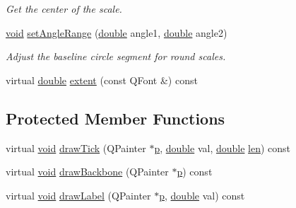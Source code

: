 \begin{DoxyCompactItemize}
\begin{DoxyCompactList}\small\item\em Get the center of the scale. \end{DoxyCompactList}\item 
\hyperlink{group___u_a_v_objects_plugin_ga444cf2ff3f0ecbe028adce838d373f5c}{void} \hyperlink{class_qwt_round_scale_draw_a5d85678fdb9fbb4d622425aab9ecc681}{set\-Angle\-Range} (\hyperlink{_super_l_u_support_8h_a8956b2b9f49bf918deed98379d159ca7}{double} angle1, \hyperlink{_super_l_u_support_8h_a8956b2b9f49bf918deed98379d159ca7}{double} angle2)
\begin{DoxyCompactList}\small\item\em Adjust the baseline circle segment for round scales. \end{DoxyCompactList}\item 
virtual \hyperlink{_super_l_u_support_8h_a8956b2b9f49bf918deed98379d159ca7}{double} \hyperlink{class_qwt_round_scale_draw_a786fd49ec94ab51bb75d7a2f495b2727}{extent} (const Q\-Font \&) const 
\end{DoxyCompactItemize}
\subsection*{Protected Member Functions}
\begin{DoxyCompactItemize}
\item 
virtual \hyperlink{group___u_a_v_objects_plugin_ga444cf2ff3f0ecbe028adce838d373f5c}{void} \hyperlink{class_qwt_round_scale_draw_a8e0363f57f85b8dcf316c9351ab72fc2}{draw\-Tick} (Q\-Painter $\ast$\hyperlink{glext_8h_aa5367c14d90f462230c2611b81b41d23}{p}, \hyperlink{_super_l_u_support_8h_a8956b2b9f49bf918deed98379d159ca7}{double} val, \hyperlink{_super_l_u_support_8h_a8956b2b9f49bf918deed98379d159ca7}{double} \hyperlink{glext_8h_ac759c9f8b2506530e65879e566e59f02}{len}) const 
\item 
virtual \hyperlink{group___u_a_v_objects_plugin_ga444cf2ff3f0ecbe028adce838d373f5c}{void} \hyperlink{class_qwt_round_scale_draw_a845dc48b006ee168415112f39e80da09}{draw\-Backbone} (Q\-Painter $\ast$\hyperlink{glext_8h_aa5367c14d90f462230c2611b81b41d23}{p}) const 
\item 
virtual \hyperlink{group___u_a_v_objects_plugin_ga444cf2ff3f0ecbe028adce838d373f5c}{void} \hyperlink{class_qwt_round_scale_draw_aa43bf3624c464727bb4f0cab28c3f6fe}{draw\-Label} (Q\-Painter $\ast$\hyperlink{glext_8h_aa5367c14d90f462230c2611b81b41d23}{p}, \hyperlink{_super_l_u_support_8h_a8956b2b9f49bf918deed98379d159ca7}{double} val) const 
\end{DoxyCompactItemize}
